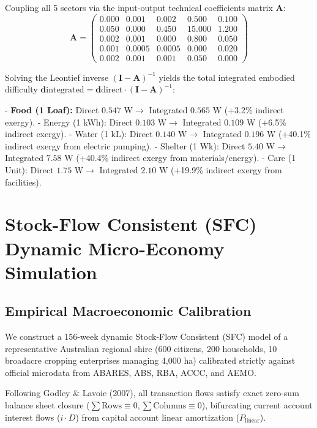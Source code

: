 \documentclass[preprint,12pt,authoryear]{elsarticle}
\theoremstyle{definition}
\begin{document}
Coupling all 5 sectors via the input-output technical coefficients matrix $\mathbf{A}$:  
$$\mathbf{A} = \begin{pmatrix} 0.000 & 0.001 & 0.002 & 0.500 & 0.100 \\ 0.050 & 0.000 & 0.450 & 15.000 & 1.200 \\ 0.002 & 0.001 & 0.000 & 0.800 & 0.050 \\ 0.001 & 0.0005 & 0.0005 & 0.000 & 0.020 \\ 0.002 & 0.001 & 0.001 & 0.050 & 0.000 \end{pmatrix}$$

  

Solving the Leontief inverse $(\mathbf{I} - \mathbf{A})^{-1}$ yields the total integrated embodied difficulty $\mathbf{d}{\text{integrated}} = \mathbf{d}{\text{direct}} \cdot (\mathbf{I} - \mathbf{A})^{-1}$:

  

  - \textbf{Food (1 Loaf):} Direct $0.547\text{ W} \longrightarrow$ Integrated $0.565\text{ W}$ (+3.2\% indirect exergy).
  - Energy (1 kWh): Direct $0.103\text{ W} \longrightarrow$ Integrated $0.109\text{ W}$ (+6.5\% indirect exergy).
  - Water (1 kL): Direct $0.140\text{ W} \longrightarrow$ Integrated $0.196\text{ W}$ (+40.1\% indirect exergy from electric pumping).
  - Shelter (1 Wk): Direct $5.40\text{ W} \longrightarrow$ Integrated $7.58\text{ W}$ (+40.4\% indirect exergy from materials/energy).
  - Care (1 Unit): Direct $1.75\text{ W} \longrightarrow$ Integrated $2.10\text{ W}$ (+19.9\% indirect exergy from facilities).

\section{Stock-Flow Consistent (SFC) Dynamic Micro-Economy Simulation}

\subsection{Empirical Macroeconomic Calibration}

We construct a 156-week dynamic Stock-Flow Consistent (SFC) model of a representative Australian regional shire (600 citizens, 200 households, 10 broadacre cropping enterprises managing 4,000 ha) calibrated strictly against official microdata from ABARES, ABS, RBA, ACCC, and AEMO.

  

Following Godley \& Lavoie (2007), all transaction flows satisfy exact zero-sum balance sheet closure ($\sum \text{Rows} \equiv 0, \sum \text{Columns} \equiv 0$), bifurcating current account interest flows ($i \cdot D$) from capital account linear amortization ($P_{\text{linear}}$).
\end{document}
